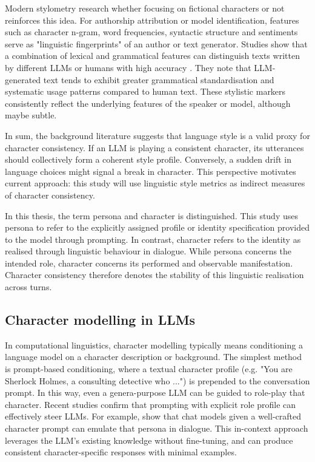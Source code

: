 \documentclass{article}
\begin{document}
Modern stylometry research whether focusing on fictional characters or not reinforces this idea. For authorship attribution or model identification, features such as character n-gram, word frequencies, syntactic structure and sentiments serve as "linguistic fingerprints" of an author or text generator. Studies show that a combination of lexical and grammatical features can distinguish texts written by different LLMs or humans with high accuracy \citep{przystalski2025stylometry}. They note that LLM-generated text tends to exhibit greater grammatical standardisation and systematic usage patterns compared to human text. These stylistic markers consistently reflect the underlying features of the speaker or model, although maybe subtle.

In sum, the background literature suggests that language style is a valid proxy for character consistency. If an LLM is playing a consistent character, its utterances should collectively form a coherent style profile. Conversely, a sudden drift in language choices might signal a break in character. This perspective motivates current approach: this study will use linguistic style metrics as indirect measures of character consistency.

In this thesis, the term persona and character is distinguished. This study uses persona to refer to the explicitly assigned profile or identity specification provided to the model through prompting. In contrast, character refers to the identity as realised through linguistic behaviour in dialogue. While persona concerns the intended role, character concerns its performed and observable manifestation. Character consistency therefore denotes the stability of this linguistic realisation across turns.

\subsection{Character modelling in LLMs}

In computational linguistics, character modelling typically means conditioning a language model on a character description or background. The simplest method is prompt-based conditioning, where a textual character profile (e.g. "You are Sherlock Holmes, a consulting detective who ...") is prepended to the conversation prompt. In this way, even a genera-purpose LLM can be guided to role-play that character. Recent studies confirm that prompting with explicit role profile can effectively steer LLMs. For example, \cite{chen2023autoagents, tu2024charactereval} show that chat models given a well-crafted character prompt can emulate that persona in dialogue. This in-context approach leverages the LLM's existing knowledge without fine-tuning, and can produce consistent character-specific responses with minimal examples.
\end{document}
